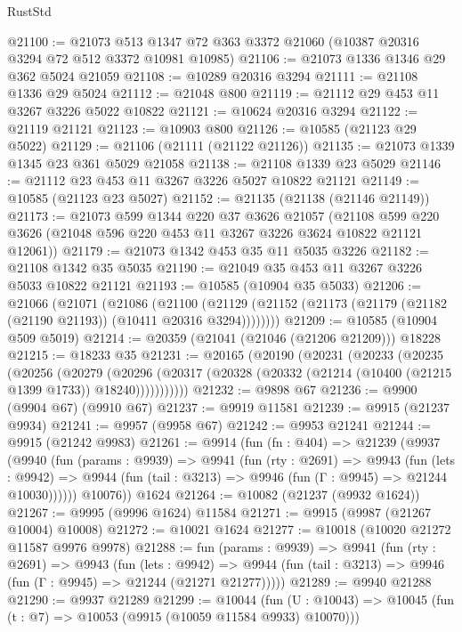 \begin{lexlean}{RustStd}
\begin{coremodule}
{\begin{coremodule}
{{{{{{{{{{{{{{{{{{{{{{{{{@21100 := @21073 @513 @1347 @72 @363 @3372 @21060 (@10387 @20316 @3294 @72 @512 @3372 @10981 @10985)
@21106 := @21073 @1336 @1346 @29 @362 @5024 @21059
@21108 := @10289 @20316 @3294
@21111 := @21108 @1336 @29 @5024
@21112 := @21048 @800
@21119 := @21112 @29 @453 @11 @3267 @3226 @5022 @10822
@21121 := @10624 @20316 @3294
@21122 := @21119 @21121
@21123 := @10903 @800
@21126 := @10585 (@21123 @29 @5022)
@21129 := @21106 (@21111 (@21122 @21126))
@21135 := @21073 @1339 @1345 @23 @361 @5029 @21058
@21138 := @21108 @1339 @23 @5029
@21146 := @21112 @23 @453 @11 @3267 @3226 @5027 @10822 @21121
@21149 := @10585 (@21123 @23 @5027)
@21152 := @21135 (@21138 (@21146 @21149))
@21173 := @21073
    @599
    @1344
    @220
    @37
    @3626
    @21057
    (@21108 @599 @220 @3626 (@21048 @596 @220 @453 @11 @3267 @3226 @3624 @10822 @21121 @12061))
@21179 := @21073 @1342 @453 @35 @11 @5035 @3226
@21182 := @21108 @1342 @35 @5035
@21190 := @21049 @35 @453 @11 @3267 @3226 @5033 @10822 @21121
@21193 := @10585 (@10904 @35 @5033)
@21206 := @21066
    (@21071
      (@21086
        (@21100
          (@21129 (@21152 (@21173 (@21179 (@21182 (@21190 @21193)) (@10411 @20316 @3294))))))))
@21209 := @10585 (@10904 @509 @5019)
@21214 := @20359 (@21041 (@21046 (@21206 @21209))) @18228
@21215 := @18233 @35
@21231 := @20165
    (@20190
      (@20231
        (@20233
          (@20235
            (@20256
              (@20279
                (@20296
                  (@20317 (@20328 (@20332 (@21214 (@10400 (@21215 @1399 @1733)) @18240)))))))))))
@21232 := @9898 @67
@21236 := @9900 (@9904 @67) (@9910 @67)
@21237 := @9919 @11581
@21239 := @9915 (@21237 @9934)
@21241 := @9957 (@9958 @67)
@21242 := @9953 @21241
@21244 := @9915 (@21242 @9983)
@21261 := @9914
    (fun (fn : @404) =>
    @21239
      (@9937
        (@9940
          (fun (params : @9939) =>
          @9941
            (fun (rty : @2691) =>
            @9943
              (fun (lets : @9942) =>
              @9944 (fun (tail : @3213) => @9946 (fun (Γ : @9945) => @21244 @10030))))))
        @10076))
    @1624
@21264 := @10082 (@21237 (@9932 @1624))
@21267 := @9995 (@9996 @1624) @11584
@21271 := @9915 (@9987 (@21267 @10004) @10008)
@21272 := @10021 @1624
@21277 := @10018 (@10020 @21272 @11587 @9976 @9978)
@21288 := fun (params : @9939) =>
  @9941
    (fun (rty : @2691) =>
    @9943
      (fun (lets : @9942) =>
      @9944 (fun (tail : @3213) => @9946 (fun (Γ : @9945) => @21244 (@21271 @21277)))))
@21289 := @9940 @21288
@21290 := @9937 @21289
@21299 := @10044
    (fun (U : @10043) => @10045 (fun (t : @7) => @10053 (@9915 (@10059 @11584 @9933) @10070)))
}}}}}}}}}}}}}}}}}}}}}}}}}
\end{coremodule}}
\end{coremodule}
\end{lexlean}
